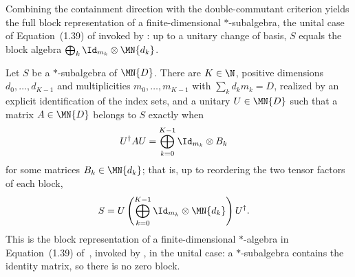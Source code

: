 Combining the containment direction with the double-commutant criterion
yields the full block representation of a finite-dimensional
$*$-subalgebra, the unital case of Equation~(1.39) of
\cite{Wolf2012Quantum} invoked by
\cite[Theorem~6.14]{Wolf2012Quantum}: up to a unitary change of basis, $S$
equals the block algebra $\bigoplus_k\Id_{m_k}\otimes\MN{d_k}$.

\begin{theorem}%
    \label{thm:starSubalgebra_unitary_block_diagonal_iff}
    \leanok
    Let $S$ be a $*$-subalgebra of $\MN{D}$. There are $K\in\N$, positive
    dimensions $d_0,\ldots,d_{K-1}$ and multiplicities
    $m_0,\ldots,m_{K-1}$ with $\sum_kd_km_k=D$, realized by an explicit
    identification of the index sets, and a unitary $U\in\MN{D}$ such that
    a matrix $A\in\MN{D}$ belongs to $S$ exactly when
    \begin{align}
        U^\dagger A U
        &=\bigoplus_{k=0}^{K-1}\Id_{m_k}\otimes B_k
        \label{eq:spectral_full_block}
    \end{align}
    for some matrices $B_k\in\MN{d_k}$; that is, up to reordering the two
    tensor factors of each block,
    \begin{align}
        S
        &=U\left(\bigoplus_{k=0}^{K-1}
          \Id_{m_k}\otimes\MN{d_k}\right)U^\dagger.
        \notag
    \end{align}
    This is the block representation of a finite-dimensional $*$-algebra in
    Equation~(1.39) of~\cite{Wolf2012Quantum}, invoked by
    \cite[Theorem~6.14]{Wolf2012Quantum}, in the unital case: a
    $*$-subalgebra contains the identity matrix, so there is no zero block.
\end{theorem}

